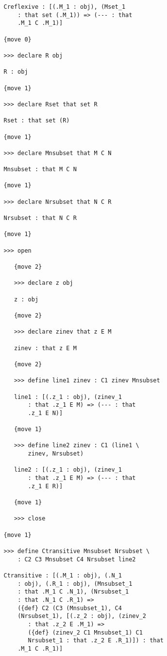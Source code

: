 \documentclass[12pt]{article}
\begin{document}
\begin{enumerate}
\begin{verbatim}
   Creflexive : [(.M_1 : obj), (Mset_1 
       : that set (.M_1)) => (--- : that 
       .M_1 C .M_1)]

   {move 0}

   >>> declare R obj

   R : obj

   {move 1}

   >>> declare Rset that set R

   Rset : that set (R)

   {move 1}

   >>> declare Mnsubset that M C N

   Mnsubset : that M C N

   {move 1}

   >>> declare Nrsubset that N C R

   Nrsubset : that N C R

   {move 1}

   >>> open

      {move 2}

      >>> declare z obj

      z : obj

      {move 2}

      >>> declare zinev that z E M

      zinev : that z E M

      {move 2}

      >>> define line1 zinev : C1 zinev Mnsubset

      line1 : [(.z_1 : obj), (zinev_1 
          : that .z_1 E M) => (--- : that 
          .z_1 E N)]

      {move 1}

      >>> define line2 zinev : C1 (line1 \
          zinev, Nrsubset)

      line2 : [(.z_1 : obj), (zinev_1 
          : that .z_1 E M) => (--- : that 
          .z_1 E R)]

      {move 1}

      >>> close

   {move 1}

   >>> define Ctransitive Mnsubset Nrsubset \
       : C2 C3 Mnsubset C4 Nrsubset line2

   Ctransitive : [(.M_1 : obj), (.N_1 
       : obj), (.R_1 : obj), (Mnsubset_1 
       : that .M_1 C .N_1), (Nrsubset_1 
       : that .N_1 C .R_1) => 
       ({def} C2 (C3 (Mnsubset_1), C4 
       (Nrsubset_1), [(.z_2 : obj), (zinev_2 
          : that .z_2 E .M_1) => 
          ({def} (zinev_2 C1 Mnsubset_1) C1 
          Nrsubset_1 : that .z_2 E .R_1)]) : that 
       .M_1 C .R_1)]


\end{verbatim}
\end{enumerate}
\end{document}
